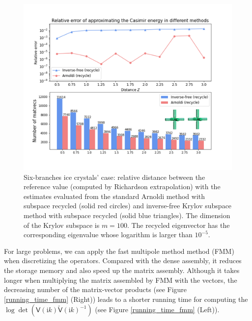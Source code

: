         \begin{figure}[H]
                \centering
                \includegraphics[width = \textwidth]{figures/6branches_rel_err.png}
                \caption{Six-branches ice crystals' case: relative distance between the reference value (computed by Richardson extrapolation) with the estimates evaluated from the standard Arnoldi 
                method with subspace recycled (solid red circles) and inverse-free Krylov subspace method with subspace recycled (solid blue triangles). The dimension of the Krylov subspace is $m = 100$.
                The recycled eigenvector has the corresponding eigenvalue whose logarithm is larger than $10^{-5}$.}       
             \end{figure}
For large problems, we can apply the fast multipole method method (FMM)\cite{ying2004kernel} when discretizing the operators. Compared with the dense assembly, it reduces 
the storage memory and also speed up the matrix assembly. Although it takes longer when multiplying the matrix assembled by FMM with the vectors, 
the decreasing number of the matrix-vector products (see Figure \ref{running_time_fmm} (Right)) leads to a shorter running time for computing the $\log\det(\mathsf{V}(\mathrm{i}k)\tilde{\mathsf{V}}(\mathrm{i}k)^{-1})$
(see Figure \ref{running_time_fmm} (Left)). 
